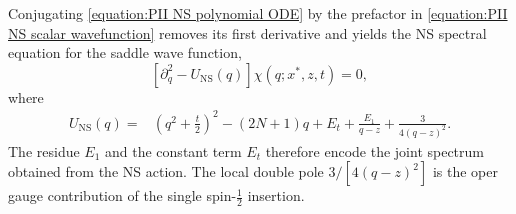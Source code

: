 \documentclass[a4paper,11pt]{article}
\numberwithin{equation}{section}
\begin{document}
Conjugating \eqref{equation:PII NS polynomial ODE} by the prefactor in
\eqref{equation:PII NS scalar wavefunction} removes its first
derivative and yields the NS spectral equation for the saddle wave
function,
\begin{equation}
	\label{equation:PII NS unscaled quantum oper}
	\left[\partial_{q}^{2}-U_{\mathrm{NS}}(q)\right]
	\chi(q;x^{*},z,t)=0,
\end{equation}
where
\begin{equation}
	\label{equation:PII NS unscaled oper potential}
	\begin{aligned}
		U_{\mathrm{NS}}(q)={}&
		\left(q^{2}+\frac{t}{2}\right)^{2}
		-(2N+1)q+E_{t}
		+\frac{E_{1}}{q-z}+\frac{3}{4(q-z)^{2}}.
	\end{aligned}
\end{equation}
The residue $E_{1}$ and the constant term $E_{t}$ therefore
encode the joint spectrum obtained from the NS action.  The local
double pole $3/[4(q-z)^{2}]$ is the oper gauge contribution
of the single spin-$\frac{1}{2}$ insertion.
\end{document}
